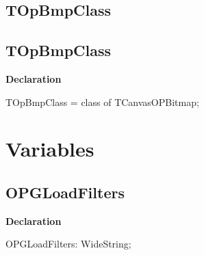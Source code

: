 \documentclass{report}
\newif\ifpdf
\begin{document}
\subsection*{\large{\textbf{TOpBmpClass}}\normalsize\hspace{1ex}\hrulefill}
\else
\subsection*{TOpBmpClass}
\fi
\label{opbitmapformats-TOpBmpClass}
\begin{list}{}{
\setlength{\itemindent}{0cm}
\setlength{\listparindent}{0cm}
\setlength{\leftmargin}{\evensidemargin}
\addtolength{\leftmargin}{\tmplength}
\settowidth{\labelsep}{X}
\addtolength{\leftmargin}{\labelsep}
\setlength{\labelwidth}{\tmplength}
}
\item[\textbf{Declaration}\hfill]
\ifpdf
\begin{flushleft}
\fi
\begin{ttfamily}
TOpBmpClass = class of TCanvasOPBitmap;\end{ttfamily}

\ifpdf
\end{flushleft}
\fi

\end{list}
\section{Variables}
\ifpdf
\subsection*{\large{\textbf{OPGLoadFilters}}\normalsize\hspace{1ex}\hrulefill}
\else
\subsection*{OPGLoadFilters}
\fi
\label{opbitmapformats-OPGLoadFilters}
\begin{list}{}{
\setlength{\itemindent}{0cm}
\setlength{\listparindent}{0cm}
\setlength{\leftmargin}{\evensidemargin}
\addtolength{\leftmargin}{\tmplength}
\settowidth{\labelsep}{X}
\addtolength{\leftmargin}{\labelsep}
\setlength{\labelwidth}{\tmplength}
}
\item[\textbf{Declaration}\hfill]
\ifpdf
\begin{flushleft}
\fi
\begin{ttfamily}
OPGLoadFilters: WideString;\end{ttfamily}

\ifpdf
\end{flushleft}
\fi

\end{list}
\ifpdf
\end{document}
